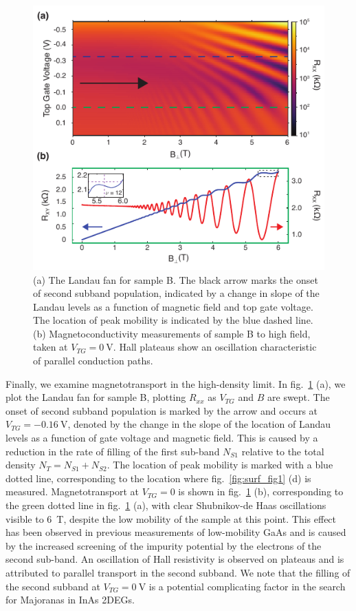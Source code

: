 \begin{figure}
    \includegraphics[width=0.6\linewidth]{Figure5}
    \caption[Second subband filling]{\label{fig:surf_fig5}(a) The Landau fan for sample B. The black arrow marks the onset of second subband population, indicated by a change in slope of the Landau levels as a function of magnetic field and top gate voltage. The location of peak mobility is indicated by the blue dashed line. (b) Magnetoconductivity measurements of sample B to high field, taken at $V_{TG} = \SI{0}{\volt}$. Hall plateaus show an oscillation characteristic of parallel conduction paths.}
\end{figure}

Finally, we examine magnetotransport in the high-density limit. In fig.~\ref{fig:surf_fig5} (a), we plot the Landau fan for sample B, plotting $R_{xx}$ as $V_{TG}$ and $B$ are swept. The onset of second subband population is marked by the arrow and occurs at $V_{TG} = \SI{-0.16}{\volt}$, denoted by the change in the slope of the location of Landau levels as a function of gate voltage and magnetic field\cite{PhysRevB.74.195313,STORMER1982707}. This is caused by a reduction in the rate of filling of the first sub-band $N_{S1}$ relative to the total density $N_T = N_{S1} + N_{S2}$. The location of peak mobility is marked with a blue dotted line, corresponding to the location where fig.~\ref{fig:surf_fig1} (d) is measured. Magnetotransport at $V_{TG} = 0$ is shown in fig.~\ref{fig:surf_fig5} (b), corresponding to the green dotted line in fig.~\ref{fig:surf_fig5} (a), with clear Shubnikov-de Haas oscillations visible to \SI{6}{\tesla}, despite the low mobility of the sample at this point. This effect has been observed in previous measurements of low-mobility GaAs and is caused by the increased screening of the impurity potential by the electrons of the second sub-band\cite{PhysRevB.38.7866}. An oscillation of Hall resistivity is observed on plateaus and is attributed to parallel transport in the second subband. We note that the filling of the second subband at $V_{TG} = \SI{0}{\volt}$ is a potential complicating factor in the search for Majoranas in InAs 2DEGs\cite{s41578-018-0003-1}.


